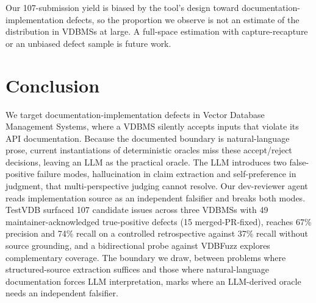 \documentclass[sigconf]{acmart}
\begin{document}
Our 107-submission yield is biased by the tool's design toward documentation-implementation defects, so the proportion we observe is not an estimate of the distribution in VDBMSs at large. A full-space estimation with capture-recapture or an unbiased defect sample is future work.

\section{Conclusion}
\label{sec:concl}

We target documentation-implementation defects in Vector Database Management Systems, where a VDBMS silently accepts inputs that violate its API documentation. Because the documented boundary is natural-language prose, current instantiations of deterministic oracles miss these accept/reject decisions, leaving an LLM as the practical oracle. The LLM introduces two false-positive failure modes, hallucination in claim extraction and self-preference in judgment, that multi-perspective judging cannot resolve. Our dev-reviewer agent reads implementation source as an independent falsifier and breaks both modes. TestVDB surfaced 107 candidate issues across three VDBMSs with 49 maintainer-acknowledged true-positive defects (15 merged-PR-fixed), reaches 67\% precision and 74\% recall on a controlled retrospective against 37\% recall without source grounding, and a bidirectional probe against VDBFuzz explores complementary coverage. The boundary we draw, between problems where structured-source extraction suffices and those where natural-language documentation forces LLM interpretation, marks where an LLM-derived oracle needs an independent falsifier.



\end{document}
